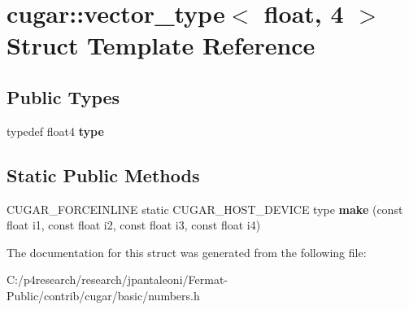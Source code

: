 \hypertarget{structcugar_1_1vector__type_3_01float_00_014_01_4}{}\section{cugar\+:\+:vector\+\_\+type$<$ float, 4 $>$ Struct Template Reference}
\label{structcugar_1_1vector__type_3_01float_00_014_01_4}
\subsection*{Public Types}
\begin{DoxyCompactItemize}
\item 
\mbox{\label{structcugar_1_1vector__type_3_01float_00_014_01_4_a5a0cc52377715f48ca533210629c668b}} 
typedef float4 {\bfseries type}
\end{DoxyCompactItemize}
\subsection*{Static Public Methods}
\begin{DoxyCompactItemize}
\item 
\mbox{\label{structcugar_1_1vector__type_3_01float_00_014_01_4_ac8a8e7a7fb92d687499cca03aa7db26c}} 
C\+U\+G\+A\+R\+\_\+\+F\+O\+R\+C\+E\+I\+N\+L\+I\+NE static C\+U\+G\+A\+R\+\_\+\+H\+O\+S\+T\+\_\+\+D\+E\+V\+I\+CE type {\bfseries make} (const float i1, const float i2, const float i3, const float i4)
\end{DoxyCompactItemize}


The documentation for this struct was generated from the following file\+:\begin{DoxyCompactItemize}
\item 
C\+:/p4research/research/jpantaleoni/\+Fermat-\/\+Public/contrib/cugar/basic/numbers.\+h\end{DoxyCompactItemize}
